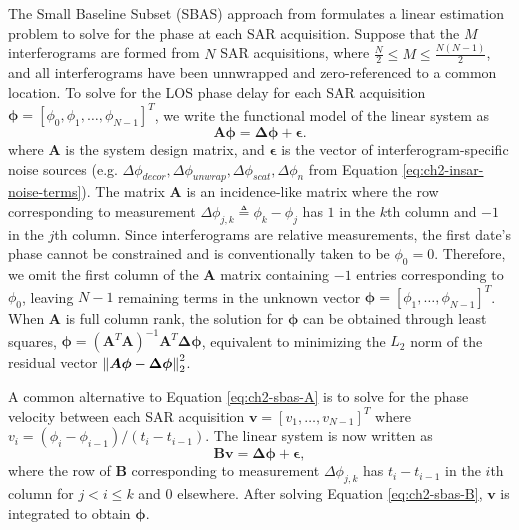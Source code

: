 


The Small Baseline Subset (SBAS) approach from \cite{Berardino2002NewAlgorithmSurface} formulates a linear estimation problem to solve for the phase at each SAR acquisition.
Suppose that the $M$ interferograms are formed from $N$ SAR acquisitions, where $ \frac{N}{2} \leq M \leq \frac{N(N - 1)}{2} $, and all interferograms have been unnwrapped and zero-referenced to a common location.
To solve for the LOS phase delay for each SAR acquisition $ \bm{\phi} = \left[\phi_0, \phi_1, \ldots, \phi_{N-1} \right]^T $, 
we write the functional model of the linear system as
\begin{equation}
	\bm{A \phi} = \bm{\Delta \phi} + \bm{\epsilon} . \label{eq:ch2-sbas-A}
\end{equation}
where  $\bm{A}$ is the system design matrix, and $ \bm{\epsilon}  $ is the vector of interferogram-specific noise sources (e.g. $ \Delta \phi_{decor}, \Delta \phi_{unwrap}, \Delta \phi_{scat}, \Delta \phi_{n} $ from Equation \eqref{eq:ch2-insar-noise-terms}).
The matrix $\bm{A}$ is an incidence-like matrix where the row corresponding to measurement $ \Delta \phi_{j,k} \triangleq \phi_k - \phi_j $ has $1$ in the $k$th column and $-1$ in the $j$th column.
Since interferograms are relative measurements, the first date's phase cannot be constrained and is conventionally taken to be $\phi_0 = 0$. Therefore, we omit the first column of the $ \bm{A} $ matrix containing $-1$ entries corresponding to $\phi_0$, leaving $N-1$ remaining terms in the unknown vector $ \bm{\phi} = \left[\phi_1, \ldots, \phi_{N-1} \right]^T $.
When $ \bm{A} $ is full column rank, the solution for $ \bm{\phi} $ can be obtained through least squares, $ \bm{\phi} = (\bm{A}^T \bm{A})^{-1}\bm{A}^T \bm{\Delta \phi}
 $, equivalent to minimizing the $L_2$ norm of the residual vector $\left\lVert\bm{A \phi} - \bm{\Delta \phi}\right\rVert^2_2 $.

A common alternative to Equation \eqref{eq:ch2-sbas-A} is to solve for the phase velocity between each SAR acquisition $\bm{v} = [v_1, \ldots, v_{N-1}]^T$ where $ v_i = (\phi_i - \phi_{i-1})/(t_i - t_{i-1} ) $.
The linear system is now written as
\begin{equation}
	\bm{B v} = \bm{\Delta \phi} + \bm{\epsilon}, \label{eq:ch2-sbas-B}
\end{equation}
where the row of $\bm{B}$
corresponding to measurement $ \Delta \phi_{j,k} $ has $t_i - t_{i-1}$ in the $i$th column for $j < i \leq k$ and 0 elsewhere. 
After solving Equation \eqref{eq:ch2-sbas-B}, $ \bm{v} $ is integrated to obtain $ \bm{\phi} $.

